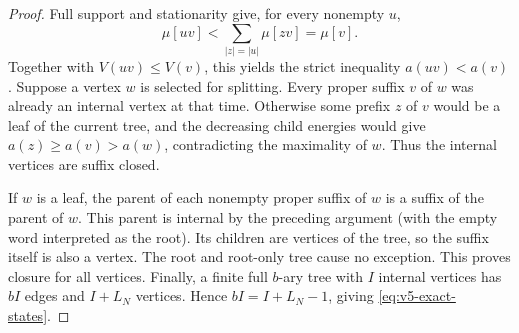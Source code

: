 \begin{proof}
Full support and stationarity give, for every nonempty $u$,
\[
 \mu[uv]<\sum_{|z|=|u|}\mu[zv]=\mu[v].
\]
Together with $V(uv)\le V(v)$, this yields the strict inequality
$a(uv)<a(v)$. Suppose a vertex $w$ is selected for splitting.
Every proper suffix $v$ of $w$ was already an internal vertex at
that time. Otherwise some prefix $z$ of $v$ would be a leaf of
the current tree, and the decreasing child energies would give
$a(z)\ge a(v)>a(w)$, contradicting the maximality of $w$.
Thus the internal vertices are suffix closed.

If $w$ is a leaf, the parent of each nonempty proper suffix of $w$
is a suffix of the parent of $w$. This parent is internal by the
preceding argument (with the empty word interpreted as the root).
Its children are vertices of the tree, so the suffix itself is
also a vertex. The root and root-only tree cause no exception.
This proves closure for all vertices. Finally, a finite full
$b$-ary tree with $I$ internal vertices has $bI$ edges and $I+L_N$
vertices. Hence $bI=I+L_N-1$, giving \eqref{eq:v5-exact-states}.
\end{proof}

